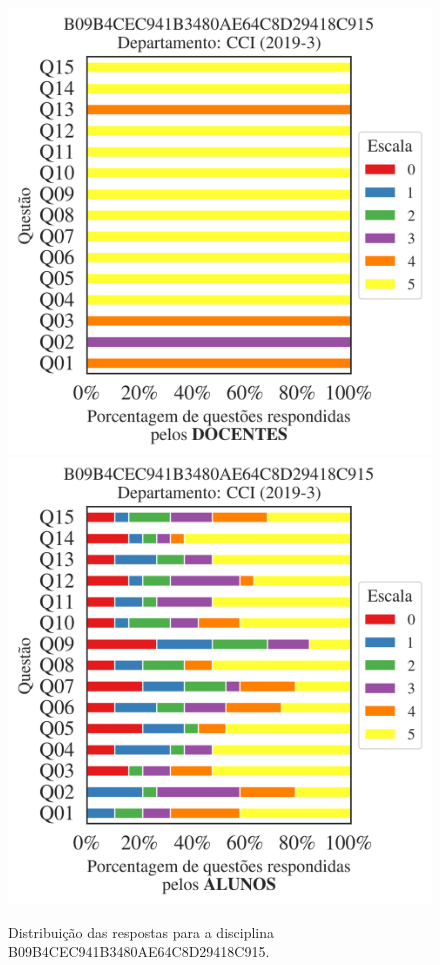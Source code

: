 \documentclass[a4paper,10pt]{article}
\begin{document}
\begin{figure}[h]
\centering
\includegraphics[width=0.485\linewidth]{analise_disciplina_departamento_CCI_B09B4CEC941B3480AE64C8D29418C915_docentes.png}
\includegraphics[width=0.485\linewidth]{analise_disciplina_departamento_CCI_B09B4CEC941B3480AE64C8D29418C915_alunos.png}
\caption{\label{fig:analise_geral_departamento}                Distribuição das respostas para a disciplina B09B4CEC941B3480AE64C8D29418C915. }
\end{figure}
\end{document}
